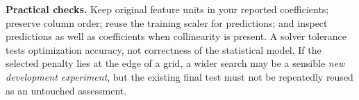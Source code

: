\textbf{Practical checks.} Keep original feature units in your reported coefficients; preserve column order;
reuse the training scaler for predictions; and inspect predictions as well as coefficients when collinearity is present.
A solver tolerance tests optimization accuracy, not correctness of the statistical model.
If the selected penalty lies at the edge of a grid, a wider search may be a sensible \emph{new development experiment},
but the existing final test must not be repeatedly reused as an untouched assessment.


